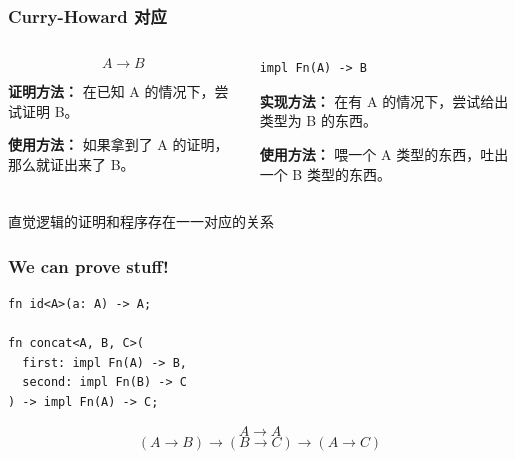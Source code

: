 \documentclass[UTF-8]{ctexbeamer}
\begin{document}
\begin{frame}[fragile]
  \frametitle{Curry-Howard 对应}

  \begin{columns}
    \begin{column}{0.5\textwidth}
      $$
      A \rightarrow B
      $$

      \pause

      \textbf{证明方法：} 在已知 A 的情况下，尝试证明 B。

      \pause
      \vspace{0.5em}

      \textbf{使用方法：} 如果拿到了 A 的证明，那么就证出来了 B。
    \end{column}
    \begin{column}{0.5\textwidth}
      \pause
      \centering
      \begin{verbatim}
impl Fn(A) -> B
      \end{verbatim}

      \pause

      \textbf{实现方法：} 在有 A 的情况下，尝试给出类型为 B 的东西。

      \pause
      \vspace{0.5em}

      \textbf{使用方法：} 喂一个 A 类型的东西，吐出一个 B 类型的东西。
    \end{column}
  \end{columns}

  \pause
  \vspace{1em}

  {
    \begin{center}
      \LARGE 直觉逻辑的证明和程序存在一一对应的关系
    \end{center}
  }
\end{frame}

\begin{frame}[fragile]
  \frametitle{We can prove stuff!}

  \begin{verbatim}
fn id<A>(a: A) -> A;

fn concat<A, B, C>(
  first: impl Fn(A) -> B,
  second: impl Fn(B) -> C
) -> impl Fn(A) -> C;
  \end{verbatim}

  \pause

  $$
  A \rightarrow A
  $$
  $$
  (A \rightarrow B) \rightarrow (B \rightarrow C) \rightarrow (A \rightarrow C)
  $$
\end{frame}
\end{document}
